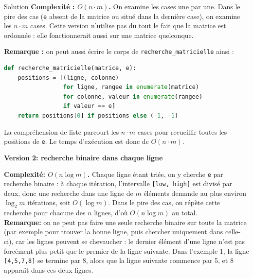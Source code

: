\begin{Exercice}[20 minutes] [Python]
\begin{Solutions}{\faTerminal \enskip Solution}
        \textbf{Complexité : $O(n \cdot m)$.} On examine les cases une par une. Dans le pire des cas (\lstinline{e} absent de la matrice ou situé dans la dernière case), on examine les $n \cdot m$ cases. Cette version n'utilise pas du tout le fait que la matrice est ordonnée : elle fonctionnerait aussi sur une matrice quelconque.

        \textbf{Remarque :} on peut aussi écrire le corps de \lstinline{recherche_matricielle} ainsi :
        \begin{lstlisting}[language=Python]
def recherche_matricielle(matrice, e):
    positions = [(ligne, colonne)
                 for ligne, rangee in enumerate(matrice)
                 for colonne, valeur in enumerate(rangee)
                 if valeur == e]
    return positions[0] if positions else (-1, -1)
\end{lstlisting}
        La compréhension de liste parcourt les $n \cdot m$ cases pour recueillir toutes les positions de \lstinline{e}. Le temps d'exécution est donc de $O(n \cdot m)$.
    \end{Solutions}
    \fi
    \begin{solution}
        \textbf{Version 2: recherche binaire dans chaque ligne}
        

        \textbf{Complexité: $O(n \log m)$.} Chaque ligne étant triée, on y cherche \lstinline{e} par recherche binaire : à chaque itération, l'intervalle \lstinline{[low, high]} est divisé par deux, donc une recherche dans une ligne de $m$ éléments demande au plus environ $\log_2 m$ itérations, soit $O(\log m)$. Dans le pire des cas, on répète cette recherche pour chacune des $n$ lignes, d'où $O(n \log m)$ au total.\\

        \textbf{Remarque:} on ne peut pas faire une seule recherche binaire sur toute la matrice (par exemple pour trouver la bonne ligne, puis chercher uniquement dans celle-ci), car les lignes peuvent se chevaucher : le dernier élément d'une ligne n'est pas forcément plus petit que le premier de la ligne suivante. Dans l'exemple 1, la ligne \lstinline{[4,5,7,8]} se termine par 8, alors que la ligne suivante commence par 5, et 8 apparaît dans ces deux lignes.
    \end{solution}

\end{Exercice}



